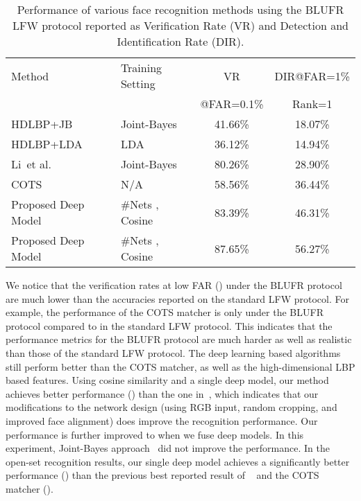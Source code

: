 \documentclass[10pt,journal,compsoc]{IEEEtran}
\newcommand{\etal}{et al.}
\begin{document}
\begin{table}[htbp]
\scriptsize
\centering
\caption{
Performance of various face recognition methods using the BLUFR LFW protocol reported as Verification Rate (VR) and Detection and Identification Rate (DIR).}\label{tab:lfw_blufr}
\begin{tabular}{l|l|c|c}
\toprule
\multirow{1}{*}{Method}          & \multirow{1}{*}{Training Setting}  & VR          & DIR@FAR=1\%   \\
                                 &                                    & @FAR=0.1\%  & Rank=1        \\
\midrule
HDLBP+JB~\cite{BLUFR}            & Joint-Bayes                        & 41.66\% & 18.07\% \\
HDLBP+LDA~\cite{BLUFR}           & LDA                                & 36.12\% & 14.94\% \\
Li~\etal~\cite{DB:CASIA}         & Joint-Bayes                        & 80.26\% & 28.90\% \\
COTS                             & N/A                                & 58.56\% & 36.44\% \\ \hline
Proposed Deep Model              & \#Nets , Cosine                    & 83.39\% & 46.31\% \\
Proposed Deep Model              & \#Nets , Cosine                    & 87.65\% & 56.27\% \\
\bottomrule
\end{tabular}
\end{table}

We notice that the verification rates at low FAR () under the BLUFR protocol are much lower than the accuracies reported on the standard LFW protocol. For example, the performance of the COTS matcher is only  under the BLUFR protocol compared to  in the standard LFW protocol. This indicates that the performance metrics for the BLUFR protocol are much harder as well as realistic than those of the standard LFW protocol. The deep learning based algorithms still perform better than the COTS matcher, as well as the high-dimensional LBP based features. Using cosine similarity and a single deep model, our method achieves better performance () than the one in~\cite{DB:CASIA}, which indicates that our modifications to the network design (using RGB input, random cropping, and improved face alignment) does improve the recognition performance. Our performance is further improved to  when we fuse  deep models. In this experiment, Joint-Bayes approach~\cite{ml:jointbayes} did not improve the performance. In the open-set recognition results, our single deep model achieves a significantly better performance () than the previous best reported result of ~\cite{DB:CASIA} and the COTS matcher ().
\end{document}
